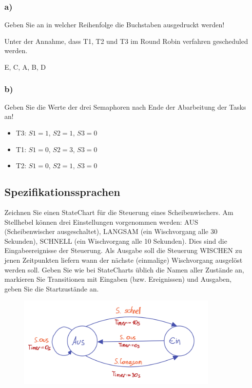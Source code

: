 \subsubsection{a)}
Geben Sie an in welcher Reihenfolge die Buchstaben ausgedruckt werden!

Unter der Annahme, dass T1, T2 und T3 im Round Robin verfahren gescheduled werden.

E, C, A, B, D


\subsubsection{b)}
Geben Sie die Werte der drei Semaphoren nach Ende der Abarbeitung der Tasks an!

\begin{itemize}
  \item T3: $S1 = 1$, $S2 = 1$, $S3 = 0$
  \item T1: $S1 = 0$, $S2 = 3$, $S3 = 0$
  \item T2: $S1 = 0$, $S2 = 1$, $S3 = 0$
\end{itemize}

\subsection{Spezifikationssprachen}
Zeichnen Sie einen StateChart für die Steuerung eines Scheibenwischers. Am Stellhebel können drei
Einstellungen vorgenommen werden: AUS (Scheibenwischer ausgeschaltet), LANGSAM (ein Wischvorgang
alle 30 Sekunden), SCHNELL (ein Wischvorgang alle 10 Sekunden). Dies sind die Eingabeereignisse der
Steuerung. Als Ausgabe soll die Steuerung WISCHEN zu jenen Zeitpunkten liefern wann der nächste
(einmalige) Wischvorgang ausgelöst werden soll.
Geben Sie wie bei StateCharts üblich die Namen aller Zustände an, markieren Sie Transitionen mit Eingaben
(bzw. Ereignissen) und Ausgaben, geben Sie die Startzustände an.

\begin{figure}[H]
  \includegraphics[width=10cm]{images/KA270921/5a.PNG}
  \centering
\end{figure}

